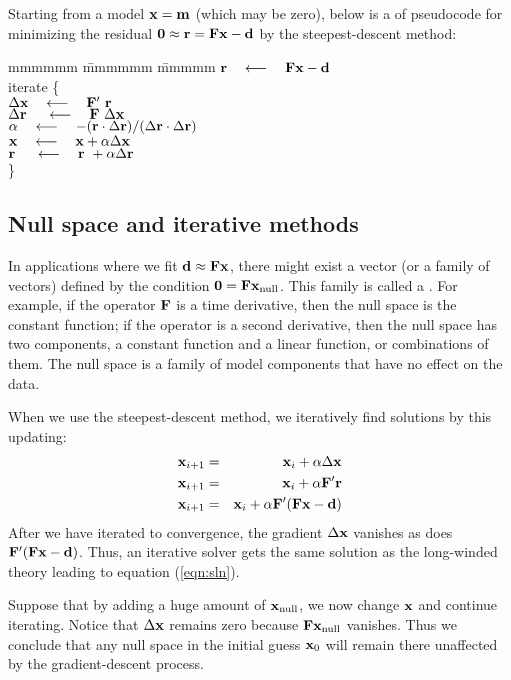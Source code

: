 \par
Starting from a model $\bold x = \bold m$ (which may be zero),
below is a  of pseudocode for minimizing the residual
$\bold 0\approx \bold r = \bold F \bold x - \bold d$
by the steepest-descent method:
\label{lsq/'sdtemplate'}
\begin{tabbing}
mmmmmm \= mmmmmm \= mmmmm \kill
\> $\bold r \quad\longleftarrow\quad \bold F \bold x - \bold d$ \\
\> {\rm iterate \{ }                                                    \\
\>      \>  $\Delta \bold x   \quad\longleftarrow\quad \bold F'\         \bold r$      \\
\>      \>  $\Delta \bold r\  \quad\longleftarrow\quad \bold F \  \Delta \bold x$      \\
\>      \> $\alpha \quad\longleftarrow\quad
                -(       \bold r \cdot \Delta\bold r )/
                 (\Delta \bold r \cdot \Delta\bold r )
                $
                \\
\>      \> $\bold x   \quad\longleftarrow\quad \bold x   + \alpha\Delta \bold x$       \\
\>      \> $\bold r\  \quad\longleftarrow\quad \bold r\  + \alpha\Delta \bold r$       \\
\>      \> \}                                                   
\end{tabbing}


\subsection{Null space and iterative methods}
In applications where we fit
$\bold d \approx\bold F \bold x$,
there might exist a vector (or a family of vectors)
defined by the condition $\bold 0 =\bold F \bold x_{\rm null}$.
This family is called a .
For example, if the operator $\bold F$ is a time derivative,
then the null space is the constant function;
if the operator is a second derivative,
then the null space has two components, a constant function
and a linear function, or combinations of them.
The null space is a family of model components that have no effect on the data.
\par
When we use the steepest-descent method,
we iteratively find solutions by this updating:
\begin{eqnarray}
\bold x_{i+1} &=& \bold x_i + \alpha \Delta \bold x                     \\
\bold x_{i+1} &=& \bold x_i + \alpha \bold F' \bold r                   \\
\bold x_{i+1} &=& \bold x_i + \alpha \bold F'(\bold F\bold x -\bold d)
\end{eqnarray}
After we have iterated to convergence,
the gradient $ \Delta \bold x$ vanishes
as does $\bold F'(\bold F\bold x -\bold d)$.
Thus, an iterative solver gets the same solution
as the long-winded theory leading to equation (\ref{eqn:sln}).
\par
Suppose that by adding a huge amount of $\bold x_{\rm null}$,
we now change $\bold x$
and continue iterating.
Notice that $ \Delta \bold x$ remains zero
because $\bold F \bold x_{\rm null}$ vanishes.
Thus we conclude that any null space in the initial guess $\bold x_0$
will remain there unaffected by the gradient-descent process.

